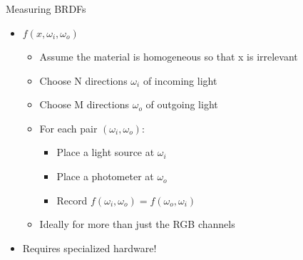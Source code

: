 \documentclass[utf8,stillsansserifmath,fleqn,t]{beamer}
\begin{document}
\begin{frame}
\frametitle{\insertsection}
Measuring BRDFs
\begin{itemize}
\item $f(x,\omega_i,\omega_o)$
    \begin{itemize}
    \item Assume the material is homogeneous so that x is irrelevant
    \item Choose N directions $\omega_i$ of incoming light
    \item Choose M directions $\omega_o$ of outgoing light
    \item For each pair $(\omega_i, \omega_o)$:
        \begin{itemize}
        \item Place a light source at $\omega_i$
        \item Place a photometer at $\omega_o$
        \item Record $f(\omega_i,\omega_o)=f(\omega_o,\omega_i)$
        \end{itemize}
    \item Ideally for more than just the RGB channels
    \end{itemize}
\item Requires specialized hardware!
\end{itemize}
\end{frame}
\end{document}
